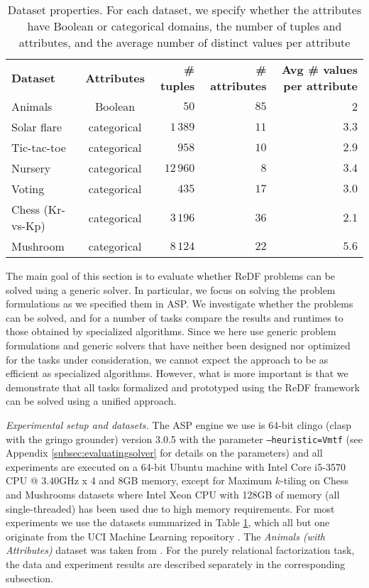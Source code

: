 
\begin{table}[b]
 \caption{Dataset properties. For each dataset,  we specify whether the attributes have Boolean or categorical domains, the number of tuples and attributes, and the average number of distinct values per attribute}
 \label{table:dataset_description}
\begin{tabular}{lcrrr}
\textbf{Dataset} & \textbf{Attributes} & \textbf{\# tuples} & \textbf{\# attributes} & \textbf{Avg \# values per attribute}  \\
Animals          & Boolean         &  $50$  &  $85$  &  2  \\
Solar flare      & categorical &  $1\,389$  &  $11$  &  $3.3$  \\
Tic-tac-toe      & categorical  &  $958$  &  $10$  &  $2.9$  \\
Nursery          & categorical &  $12\,960$  & $8$  &  $3.4$  \\
Voting           & categorical &  $435$  &  $17$  &  $3.0$  \\
Chess (Kr-vs-Kp) & categorical &  $3\,196$  &  $36$  &  $2.1$  \\ 
Mushroom         & categorical &  $8\,124$  &  $22$  &  $5.6$
\end{tabular}
\end{table}

The main goal of this section is to evaluate whether ReDF problems can be solved using a generic solver. In particular, we focus on solving the problem formulations as we specified them in ASP. We investigate whether the problems can be solved, and for a number of tasks compare the results and runtimes to those obtained by specialized algorithms. Since we here use generic problem formulations and generic solvers that have neither been designed nor optimized for the tasks under consideration, we cannot expect the approach to be as efficient as specialized algorithms. However, what is more important is that we demonstrate that all tasks formalized and prototyped using the ReDF framework can be solved using a unified approach.


\textit{Experimental setup and datasets.} The ASP engine we use is 64-bit clingo (clasp with the gringo grounder) version 3.0.5 with the parameter \texttt{--heuristic=Vmtf} (see Appendix \ref{subsec:evaluatingsolver} for details on the parameters) and all experiments are executed on a 64-bit Ubuntu machine with Intel Core i5-3570 CPU @ 3.40GHz x 4 and 8GB memory, except for Maximum $k$-tiling on Chess and Mushrooms datasets where Intel Xeon CPU with 128GB of memory (all single-threaded) has been used due to high memory requirements. For most experiments we use the datasets summarized in Table \ref{table:dataset_description}, which all but one originate from the UCI Machine Learning repository \parencite{ucidatasets}. The \emph{Animals (with Attributes)} dataset was taken from \cite{animalDataset}. For the purely relational factorization task, the data and experiment results are described separately in the corresponding subsection. 

